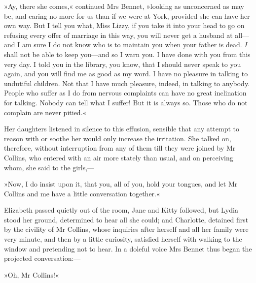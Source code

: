 »Ay, there she comes,« continued Mrs Bennet, »looking as unconcerned as may be, and caring no more for us than if we were at York, provided she can have her own way. But I tell you what, Miss Lizzy, if you take it into your head to go on refusing every offer of marriage in this way, you will never get a husband at all—and I am sure I do not know who is to maintain you when your father is dead. \textit{I} shall not be able to keep you—and so I warn you. I have done with you from this very day. I told you in the library, you know, that I should never speak to you again, and you will find me as good as my word. I have no pleasure in talking to undutiful children. Not that I have much pleasure, indeed, in talking to anybody. People who suffer as I do from nervous complaints can have no great inclination for talking. Nobody can tell what I suffer! But it is always so. Those who do not complain are never pitied.«

Her daughters listened in silence to this effusion, sensible that any attempt to reason with or soothe her would only increase the irritation. She talked on, therefore, without interruption from any of them till they were joined by Mr Collins, who entered with an air more stately than usual, and on perceiving whom, she said to the girls,—

»Now, I do insist upon it, that you, all of you, hold your tongues, and let Mr Collins and me have a little conversation together.«

Elizabeth passed quietly out of the room, Jane and Kitty followed, but Lydia stood her ground, determined to hear all she could; and Charlotte, detained first by the civility of Mr Collins, whose inquiries after herself and all her family were very minute, and then by a little curiosity, satisfied herself with walking to the window and pretending not to hear. In a doleful voice Mrs Bennet thus began the projected conversation:—

»Oh, Mr Collins!«

